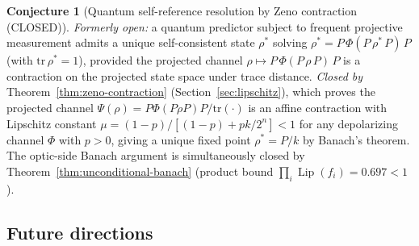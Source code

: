 \documentclass[11pt,a4paper]{article}
\theoremstyle{plain}
\theoremstyle{definition}
\newtheorem{conjecture}[theorem]{Conjecture}
\theoremstyle{remark}
\DeclareMathOperator{\Lip}{Lip}
\begin{document}
\begin{conjecture}[Quantum self-reference resolution by Zeno contraction (CLOSED)]
\label{conj:zeno-selfref}
\emph{Formerly open:} a quantum predictor subject to frequent projective
measurement admits a unique self-consistent state $\rho^*$ solving
$\rho^* = P\,\Phi(P\,\rho^*\,P)\,P$ (with $\mathrm{tr}\,\rho^* = 1$),
provided the projected channel $\rho \mapsto P\,\Phi(P\,\rho\,P)\,P$ is
a contraction on the projected state space under trace distance.
\emph{Closed by} Theorem~\ref{thm:zeno-contraction}
(Section~\ref{sec:lipschitz}), which proves the projected channel
$\Psi(\rho)=P\Phi(P\rho P)P/\mathrm{tr}(\cdot)$ is an affine contraction
with Lipschitz constant $\mu=(1-p)/[(1-p)+pk/2^{n}]<1$ for any
depolarizing channel $\Phi$ with $p>0$, giving a unique fixed point
$\rho^*=P/k$ by Banach's theorem. The optic-side Banach argument is
simultaneously closed by Theorem~\ref{thm:unconditional-banach}
(product bound $\prod_{i}\Lip(f_{i})=0.697<1$).
\end{conjecture}

\subsection{Future directions}\label{sec:future-directions}
\end{document}
